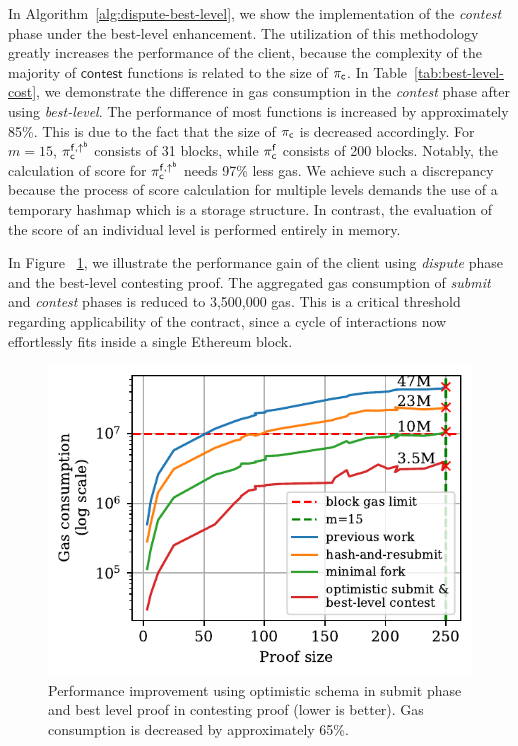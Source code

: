 In Algorithm~\ref{alg:dispute-best-level}, we show the implementation of the
\emph{contest} phase under the best-level enhancement. The utilization of
this methodology greatly increases the performance of the client,
because the complexity of the majority of $\textsf{contest}$ functions is
related to the size of $\mathsf{\pi_{c}}$. In Table~\ref{tab:best-level-cost}, we
demonstrate the difference in gas consumption in the \emph{contest} phase after
using \emph{best-level}. The performance of most functions is increased by
approximately 85\%. This is due to the fact that the size of $\mathsf{\pi_{c}}$ is
decreased accordingly. For $m=15$, $\mathsf{\pi_{c}^{f, \uparrow^{b}}}$ consists of 31 blocks, while
$\mathsf{\pi_{c}^{f}}$ consists of 200 blocks.  Notably, the calculation of score for $\mathsf{\pi_{c}^{f, \uparrow^{b}}}$
needs 97\% less gas. We achieve such a discrepancy because the process of score
calculation for multiple levels demands the use of a temporary hashmap which is
a storage structure. In contrast, the evaluation of the score of an individual level
is performed entirely in memory.



In Figure ~\ref{fig:dispute-best-level}, we illustrate the performance gain of
the client using \emph{dispute} phase and the best-level contesting proof. The
aggregated gas consumption of \emph{submit} and \emph{contest} phases is
reduced to 3,500,000 gas. This is a critical threshold regarding applicability of
the contract, since a cycle of interactions now effortlessly fits inside a
single Ethereum block.



\begin{figure}[!h]
\vspace*{-3mm}
    \begin{center}
        \includegraphics[width=0.9\columnwidth]{figures/dispute-best-level.pdf}
    \end{center}
\vspace*{-5mm}
    \caption{Performance improvement using optimistic schema in submit phase
        and best level proof in contesting proof (lower is better). Gas
        consumption is decreased by approximately 65\%.}
    \label{fig:dispute-best-level}
\vspace*{-5mm}
\end{figure}
